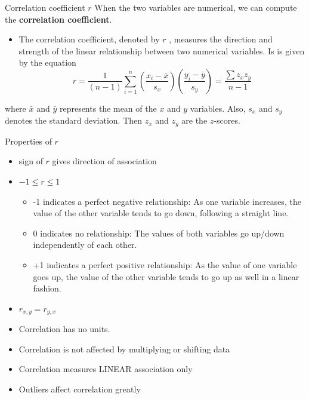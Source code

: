 \documentclass[
  ignorenonframetext,
]{beamer}
\providecommand{\tightlist}{%
  \setlength{\itemsep}{0pt}\setlength{\parskip}{0pt}}
\begin{document}
\begin{frame}{Correlation coefficient \(r\)}
\protect\hypertarget{correlation-coefficient-r}{}
When the two variables are numerical, we can compute the
\textbf{correlation coefficient}.

\begin{itemize}
\tightlist
\item
  The correlation coefficient, denoted by \(r\) , measures the direction
  and strength of the linear relationship between two numerical
  variables. Is is given by the equation
  \[r=\frac{1}{(n-1)}\sum_{i=1}^n \left(\frac{x_i-\bar{x}}{s_x}\right)\left(\frac{y_i-\bar{y}}{s_y}\right)=\frac{\sum z_x z_y}{n-1}\]
\end{itemize}

where \(\bar{x}\) and \(\bar{y}\) represents the mean of the \(x\) and
\(y\) variables. Also, \(s_x\) and \(s_y\) denotes the standard
deviation. Then \(z_x\) and \(z_y\) are the \(z\)-scores.
\end{frame}

\begin{frame}{Properties of \(r\)}
\protect\hypertarget{properties-of-r}{}
\begin{itemize}
\item
  sign of \(r\) gives direction of association
\item
  \(-1\leq r \leq 1\)

  \begin{itemize}
  \tightlist
  \item
    -1 indicates a perfect negative relationship: As one variable
    increases, the value of the other variable tends to go down,
    following a straight line.
  \item
    0 indicates no relationship: The values of both variables go up/down
    independently of each other.
  \item
    +1 indicates a perfect positive relationship: As the value of one
    variable goes up, the value of the other variable tends to go up as
    well in a linear fashion.
  \end{itemize}
\item
  \(r_{x,y}= r_{y,x}\)
\item
  Correlation has no units.
\item
  Correlation is not affected by multiplying or shifting data
\item
  Correlation measures LINEAR association only
\item
  Outliers affect correlation greatly
\end{itemize}
\end{frame}
\end{document}
